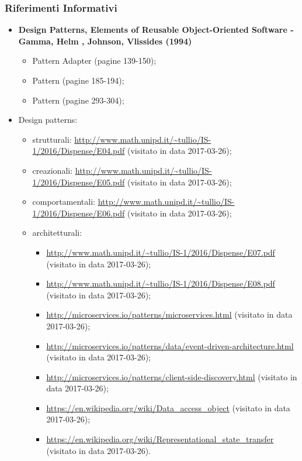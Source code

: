	 \subsubsection{Riferimenti Informativi}
	  \begin{itemize}
		\item \textbf{Design Patterns, Elements of Reusable Object-Oriented Software - Gamma, Helm , Johnson, Vlissides (1994)}
		 \begin{itemize}
		  \item Pattern Adapter (pagine 139-150);
			\item Pattern  (pagine 185-194);
			\item Pattern  (pagine 293-304);
  	 \end{itemize}
	    \item Design patterns:
	      \begin{itemize}
	       \item strutturali:
	       \url{http://www.math.unipd.it/~tullio/IS-1/2016/Dispense/E04.pdf} (visitato in data 2017-03-26);
	       \item creazionali:
	       \url{http://www.math.unipd.it/~tullio/IS-1/2016/Dispense/E05.pdf} (visitato in data 2017-03-26);
	       \item comportamentali:
	       \url{http://www.math.unipd.it/~tullio/IS-1/2016/Dispense/E06.pdf} (visitato in data 2017-03-26);
	       \item architetturali:
	       \begin{itemize}
				 \item \url{http://www.math.unipd.it/~tullio/IS-1/2016/Dispense/E07.pdf} (visitato in data 2017-03-26);
	       \item \url{http://www.math.unipd.it/~tullio/IS-1/2016/Dispense/E08.pdf} (visitato in data 2017-03-26);
	       \item \url{http://microservices.io/patterns/microservices.html} (visitato in data 2017-03-26);
	       \item \url{http://microservices.io/patterns/data/event-driven-architecture.html} (visitato in data 2017-03-26);
	       \item \url{http://microservices.io/patterns/client-side-discovery.html} (visitato in data 2017-03-26);
	       \item \url{https://en.wikipedia.org/wiki/Data_access_object} (visitato in data 2017-03-26);
	       \item \url{https://en.wikipedia.org/wiki/Representational_state_transfer} (visitato in data 2017-03-26).

\end{itemize}
\end{itemize}
\end{itemize}
